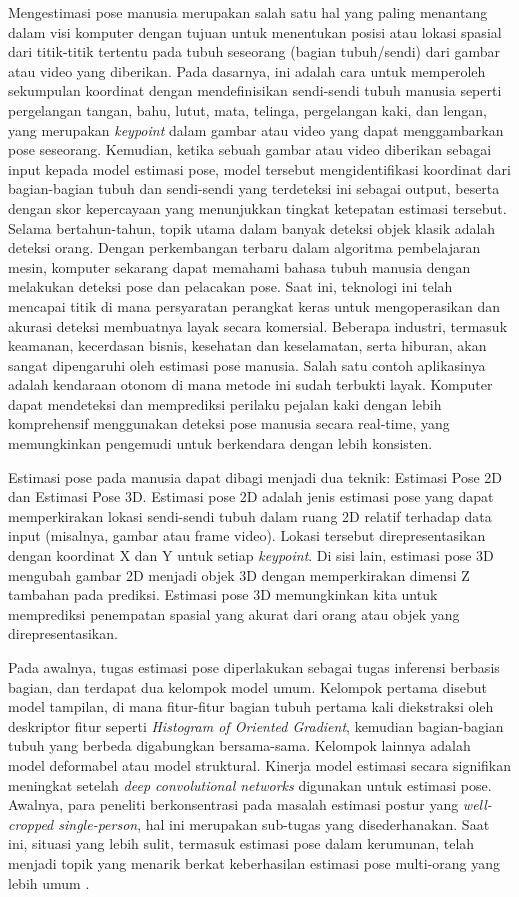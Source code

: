 Mengestimasi pose manusia merupakan salah satu hal yang paling menantang dalam visi komputer dengan tujuan untuk menentukan posisi atau lokasi spasial dari titik-titik tertentu pada tubuh seseorang (bagian tubuh/sendi) dari gambar atau video yang diberikan.
Pada dasarnya, ini adalah cara untuk memperoleh sekumpulan koordinat dengan mendefinisikan sendi-sendi tubuh manusia seperti pergelangan tangan, bahu, lutut, mata, telinga, pergelangan kaki, dan lengan, yang merupakan \emph{keypoint} dalam gambar atau video yang dapat menggambarkan pose seseorang. Kemudian, ketika sebuah gambar atau video diberikan sebagai input kepada model estimasi pose, model tersebut mengidentifikasi koordinat dari bagian-bagian tubuh dan sendi-sendi yang terdeteksi ini sebagai output, beserta dengan skor kepercayaan yang menunjukkan tingkat ketepatan estimasi tersebut.
Selama bertahun-tahun, topik utama dalam banyak deteksi objek klasik adalah deteksi orang. Dengan perkembangan terbaru dalam algoritma pembelajaran mesin, komputer sekarang dapat memahami bahasa tubuh manusia dengan melakukan deteksi pose dan pelacakan pose. Saat ini, teknologi ini telah mencapai titik di mana persyaratan perangkat keras untuk mengoperasikan dan akurasi deteksi membuatnya layak secara komersial.
Beberapa industri, termasuk keamanan, kecerdasan bisnis, kesehatan dan keselamatan, serta hiburan, akan sangat dipengaruhi oleh estimasi pose manusia. Salah satu contoh aplikasinya adalah kendaraan otonom di mana metode ini sudah terbukti layak. Komputer dapat mendeteksi dan memprediksi perilaku pejalan kaki dengan lebih komprehensif menggunakan deteksi pose manusia secara real-time, yang memungkinkan pengemudi untuk berkendara dengan lebih konsisten.

Estimasi pose pada manusia dapat dibagi menjadi dua teknik: Estimasi Pose 2D dan Estimasi Pose 3D.
Estimasi pose 2D adalah jenis estimasi pose yang dapat memperkirakan lokasi sendi-sendi tubuh dalam ruang 2D relatif terhadap data input (misalnya, gambar atau frame video). Lokasi tersebut direpresentasikan dengan koordinat X dan Y untuk setiap \emph{keypoint}. Di sisi lain, estimasi pose 3D mengubah gambar 2D menjadi objek 3D dengan memperkirakan dimensi Z tambahan pada prediksi. Estimasi pose 3D memungkinkan kita untuk memprediksi penempatan spasial yang akurat dari orang atau objek yang direpresentasikan.

Pada awalnya, tugas estimasi pose diperlakukan sebagai tugas inferensi berbasis bagian, dan terdapat dua kelompok model umum. Kelompok pertama disebut model tampilan, di mana fitur-fitur bagian tubuh pertama kali diekstraksi oleh deskriptor fitur seperti \emph{Histogram of Oriented Gradient}, kemudian bagian-bagian tubuh yang berbeda digabungkan bersama-sama.
Kelompok lainnya adalah model deformabel atau model struktural.
Kinerja model estimasi secara signifikan meningkat setelah \emph{deep convolutional networks} digunakan untuk estimasi pose. Awalnya, para peneliti berkonsentrasi pada masalah estimasi postur yang \emph{well-cropped single-person}, hal ini merupakan sub-tugas yang disederhanakan. Saat ini, situasi yang lebih sulit, termasuk estimasi pose dalam kerumunan, telah menjadi topik yang menarik berkat keberhasilan estimasi pose multi-orang yang lebih umum \parencite{song2021}.

